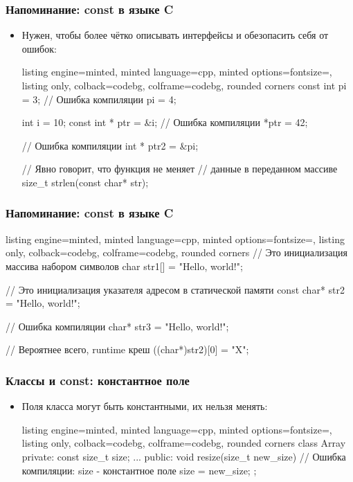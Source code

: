 \documentclass[10pt]{beamer}
\begin{document}
\begin{frame}[fragile]
\frametitle{Напоминание: const в языке C}
\begin{itemize}
\item Нужен, чтобы более чётко описывать интерфейсы и обезопасить себя от ошибок:
\begin{tcblisting}{listing engine=minted, minted language=cpp, minted options={fontsize=\scriptsize}, listing only, colback=codebg, colframe=codebg, rounded corners}
const int pi = 3;
// Ошибка компиляции
pi = 4;

int i = 10;
const int * ptr = &i;
// Ошибка компиляции
*ptr = 42;

// Ошибка компиляции
int * ptr2 = &pi;

// Явно говорит, что функция не меняет
// данные в переданном массиве
size_t strlen(const char* str);
\end{tcblisting}
\end{itemize}
\end{frame}

\begin{frame}[fragile]
\frametitle{Напоминание: const в языке C}
\begin{itemize}
\begin{tcblisting}{listing engine=minted, minted language=cpp, minted options={fontsize=\scriptsize}, listing only, colback=codebg, colframe=codebg, rounded corners}
// Это инициализация массива набором символов
char str1[] = "Hello, world!";

// Это инициализация указателя адресом в статической памяти
const char* str2 = "Hello, world!";

// Ошибка компиляции
char* str3 = "Hello, world!";

// Вероятнее всего, runtime креш
((char*)str2)[0] = "X";
\end{tcblisting}
\end{itemize}
\end{frame}

\begin{frame}[fragile]
\frametitle{Классы и const: константное поле}
\begin{itemize}
\item Поля класса могут быть константными, их нельзя менять:
\begin{tcblisting}{listing engine=minted, minted language=cpp, minted options={fontsize=\scriptsize}, listing only, colback=codebg, colframe=codebg, rounded corners}
class Array {
private:
  const size_t size;
  ...
public:
  void resize(size_t new_size) {
    // Ошибка компиляции: size - константное поле
    size = new_size;
  }
};
\end{tcblisting}
\end{itemize}
\end{frame}
\end{document}
